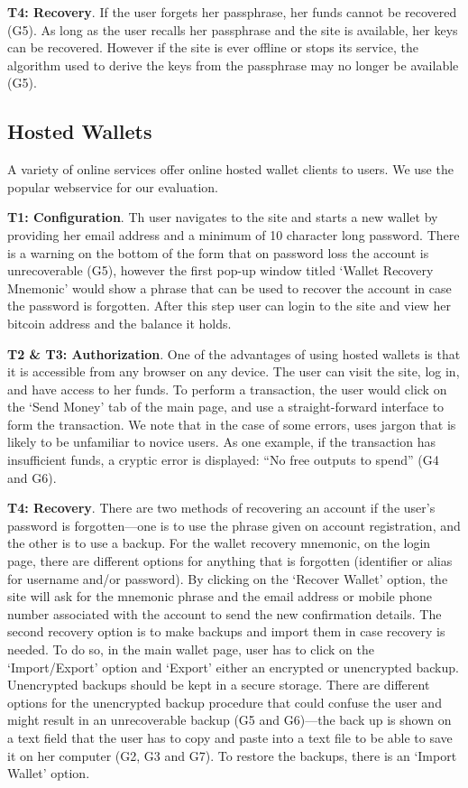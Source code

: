 \textbf{T4: Recovery}.
If the user forgets her passphrase, her funds cannot be recovered (G5). As long as the user recalls her passphrase and the \brain site is available, her keys can be recovered. However if the site is ever offline or stops its service, the algorithm used to derive the keys from the passphrase may no longer be available (G5).

\subsection{Hosted Wallets}
\label{hosted}
A variety of online services offer online hosted wallet clients to users. We use the popular \block webservice for our evaluation.

\textbf{T1: Configuration}.
Th user navigates to the \block site and starts a new wallet by providing her email address and a minimum of 10 character long password. There is a warning on the bottom of the form that on password loss the account is unrecoverable (G5), however the first pop-up window titled `Wallet Recovery Mnemonic' would show a phrase that can be used to recover the account in case the password is forgotten. After this step user can login to the site and view her bitcoin address and the balance it holds.

\textbf{T2 \& T3: Authorization}.
\label{hosted transaction}
One of the advantages of using hosted wallets is that it is accessible from any browser on any device. The user can visit the site, log in, and have access to her funds. To perform a transaction, the user would click on the `Send Money' tab of the main page, and use a straight-forward interface to form the transaction. We note that in the case of some errors, \block uses jargon that is likely to be unfamiliar to novice users. As one example, if the transaction has insufficient funds, a cryptic error is displayed: ``No free outputs to spend'' (G4 and G6).

\textbf{T4: Recovery}.
There are two methods of recovering an account if the user's password is forgotten---one is to use the phrase given on account registration, and the other is to use a backup. For the wallet recovery mnemonic, on the login page, there are different options for anything that is forgotten (identifier or alias for username and/or password). By clicking on the `Recover Wallet' option, the site will ask for the mnemonic phrase and the email address or mobile phone number associated with the account to send the new confirmation details. The second recovery option is to make backups and import them in case recovery is needed. To do so, in the main wallet page, user has to click on the `Import/Export' option and `Export' either an encrypted or unencrypted backup. Unencrypted backups should be kept in a secure storage. There are different options for the unencrypted backup procedure that could confuse the user and might result in an unrecoverable backup (G5 and G6)---the back up is shown on a text field that the user has to copy and paste into a text file to be able to save it on her computer (G2, G3 and G7). To restore the backups, there is an `Import Wallet' option.
 

